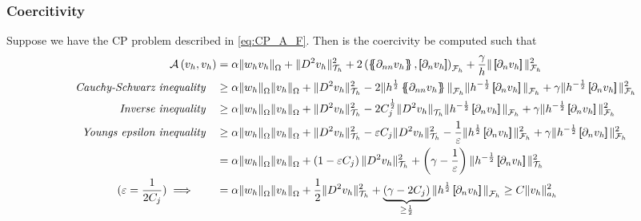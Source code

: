 \subsubsection{Coercitivity}%
\label{ssub:coercitivity}


Suppose we have the CP problem described in \eqref{eq:CP_A_F}. Then is the coercivity be computed such that
\[
    \begin{split}
\mathcal{A} \left( v_{h}, v_{h} \right) & =\alpha \|  w_{h}  v_{h} \|_{ \Omega  }^{  } +  \| D^2v_{h} \|_{ \mathcal{T} _{h} }^{2  }  + 2 \left(  \mean{ \partial _{nn} v_{h} }    ,  \jump{ \partial _{n}v_{h} }     \right) _{\mathcal{F} _{h}} +  \frac{\gamma}{h} \|  \jump{ \partial _{n} v_{h} }
  \|_{ \mathcal{F} _{h} }^{ 2 } \\
\quad \textit{Cauchy-Schwarz inequality} \quad
& \ge \alpha \| w_{h}  \|_{\Omega   }^{  } \| v_{h} \|_{\Omega   }^{  } +   \| D ^2 v_{h} \|_{ \mathcal{T} _{h} }^{2  } -2 \| h^{\frac{1}{2}} \mean{ \partial _{nn}v_{h} }    \|_{  \mathcal{F} _{h}}^{  } \| h^{-\frac{1}{2}} \jump{ \partial _{n}v_{h} }    \|_{  \mathcal{F} _{h}}^{  } + \gamma \| h^{-\frac{1}{2}}  \jump{ \partial _{n}v_{h} }   \|_{ \mathcal{F} _{h}  }^{ 2 } \\
\quad \textit{Inverse inequality} \quad
 &  \ge \alpha \| w_{h}  \|_{\Omega   }^{  } \| v_{h} \|_{\Omega   }^{  } + \| D ^2 v_{h}  \|_{ \mathcal{T} _{h}  }^{ 2  } - 2 C^{\frac{1}{2}}_{j} \|   D ^2 v_{h}    \|_{ \mathcal{T} _{h}  }^{  } \| h^{-\frac{1}{2}} \jump{ \partial _{n} v_{h} }   \|_{ \mathcal{F} _{h} }^{  }  + \gamma \| h^{ -\frac{1}{2}} \jump{
 \partial _{n } v_{h}}   \|_{ \mathcal{F}_{h}}^{2}  \\
\quad \textit{ Youngs epsilon inequality} \quad
  &  \ge\alpha \| w_{h}  \|_{\Omega   }^{  } \| v_{h} \|_{\Omega   }^{  } +  \| D ^2 v_{h} \|_{ \mathcal{T}_{h}  }^{2  } - \varepsilon C_{j} \| D ^2 v_{h} \|_{ \mathcal{T} _{h} }^{2  } - \frac{1}{\varepsilon } \| h^{\frac{1}{2}} \jump{ \partial _{n} v_{h} }   \|_{ \mathcal{F} _{h} }^{2  }  + \gamma \|
  h^{-\frac{1}{2}} \jump{ \partial _{n} v_{h}}   \|_{ \mathcal{F} _{h} }^{2  }  \\
  & =  \alpha \| w_{h}  \|_{\Omega   }^{  } \| v_{h} \|_{\Omega   }^{  } +\left( 1 - \varepsilon C_{j} \right) \| D ^2 v_{h} \|_{\mathcal{T} _{h}  }^{ 2 } + \left( \gamma  - \frac{1}{\varepsilon } \right) \| h^{-\frac{1}{2}} \jump{ \partial _{n} v_{h} }   \|_{ \mathcal{T} _{h} }^{ 2 } \\
  (\varepsilon  = \frac{1}{2 C_{j} })  \implies  \quad \quad &= \alpha \| w_{h}  \|_{\Omega   }^{  } \| v_{h} \|_{\Omega   }^{  } +\frac{1}{2} \| D ^2 v_{h} \|_{ \mathcal{T} _{h} }^{ 2 }  + \underbrace{\left( \gamma -2 C_{j} \right)}_{ \ge  \frac{1}{2}}  \| h^{\frac{1}{2}} \jump{ \partial _{n} v_{h} }   \|_{
  \mathcal{F} _{h} }^{  } \ge C \| v_{h} \|_{ a_{h} }^{  2}
    \end{split}
\]
